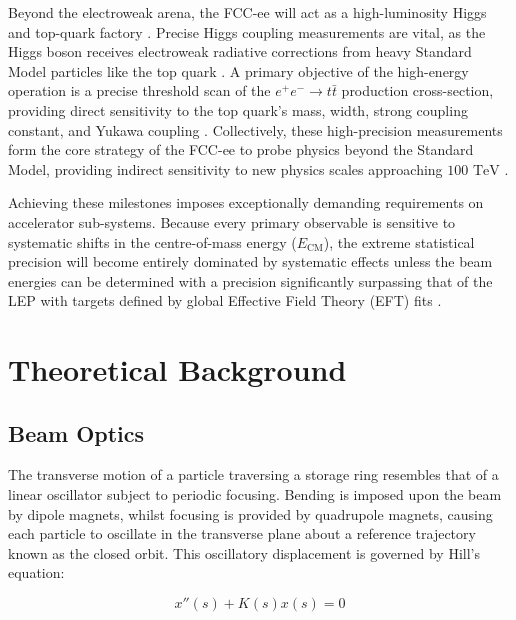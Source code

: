 \documentclass[%
 aip,
 amsmath,amssymb,
 reprint,%
superscriptaddress
]{revtex4-2}
\begin{document}
Beyond the electroweak arena, the FCC-ee will act as a high-luminosity Higgs and top-quark factory \cite{the_fcccollaboration_fcc_2019}. Precise Higgs coupling measurements are vital, as the Higgs boson receives electroweak radiative corrections from heavy Standard Model particles like the top quark \cite{the_fcccollaboration_fcc_2019, SiringoBuccheri2025}. A primary objective of the high-energy operation is a precise threshold scan of the $e^+e^- \rightarrow t\bar{t}$ production cross-section, providing direct sensitivity to the top quark's mass, width, strong coupling constant, and Yukawa coupling \cite{the_fcccollaboration_fcc_2019, denterria_physics_2016}. Collectively, these high-precision measurements form the core strategy of the FCC-ee to probe physics beyond the Standard Model, providing indirect sensitivity to new physics scales approaching $100\text{ TeV}$ \cite{the_fcccollaboration_fcc_2019, denterria_physics_2016}.

Achieving these milestones imposes exceptionally demanding requirements on accelerator sub-systems. Because every primary observable is sensitive to systematic shifts in the centre-of-mass energy ($E_{\text{CM}}$), the extreme statistical precision will become entirely dominated by systematic effects unless the beam energies can be determined with a precision significantly surpassing that of the LEP with targets defined by global Effective Field Theory (EFT) fits \cite{the_fcccollaboration_fcc_2019, denterria_physics_2016, ellis_eft_2019}.


\section{Theoretical Background}
\subsection{Beam Optics}

The transverse motion of a particle traversing a storage ring resembles that of a linear oscillator subject to periodic focusing.
Bending is imposed upon the beam by dipole magnets, whilst focusing is provided by quadrupole magnets, causing each particle to oscillate in the transverse plane about a reference trajectory known as the closed orbit.
This oscillatory displacement is governed by Hill's equation:

\begin{equation}
x''(s)+K(s)x(s)=0
\end{equation}
\end{document}
